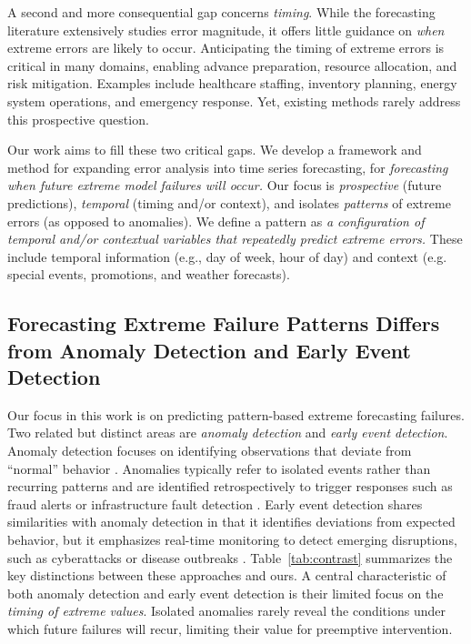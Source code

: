 \documentclass[12pt]{article}
\begin{document}
A second and more consequential gap concerns \emph{timing}. While the forecasting literature extensively studies error magnitude, it offers little guidance on \emph{when} extreme errors are likely to occur. Anticipating the timing of extreme errors is critical in many domains, enabling advance preparation, resource allocation, and risk mitigation. Examples include healthcare staffing, inventory planning, energy system operations, and emergency response. Yet, existing methods rarely address this prospective question.

Our work aims to fill these two critical gaps. We develop a framework and method for expanding error analysis into time series forecasting, for \textit{forecasting} \textit{when future extreme model failures will occur.} Our focus is \textit{prospective} (future predictions), \textit{temporal} (timing and/or context), and isolates \textit{patterns} of extreme errors (as opposed to anomalies). We define a pattern as \textit{a configuration of temporal and/or contextual} \textit{variables that repeatedly predict extreme errors.} These include temporal information (e.g., day of week, hour of day) and context (e.g. special events, promotions, and weather forecasts).

\renewcommand{\arraystretch}{1.3}

\subsection{Forecasting Extreme Failure Patterns Differs from Anomaly Detection and Early Event Detection}
\label{sec-contrasting}
Our focus in this work is on predicting pattern-based extreme forecasting failures.
Two related but distinct areas are \emph{anomaly detection} and \emph{early event detection}. Anomaly detection focuses on identifying observations that deviate from ``normal'' behavior \citep{chandola2009, nassif2021}. Anomalies typically refer to isolated events rather than recurring patterns and are identified retrospectively to trigger responses such as fraud alerts or infrastructure fault detection \citep{patcha2007, akouemo2016}.
Early event detection shares similarities with anomaly detection in that it identifies deviations from expected behavior, but it emphasizes real-time monitoring to detect emerging disruptions, such as cyberattacks or disease outbreaks \citep{wang2021, deljac2015, shmueli2010}. Table~\ref{tab:contrast} summarizes the key distinctions between these approaches and ours. A central characteristic %
of both anomaly detection and early event detection is their limited focus on the \emph{timing of extreme %
values}. Isolated anomalies rarely reveal the conditions under which future failures will recur, limiting their value for preemptive intervention.
\end{document}
